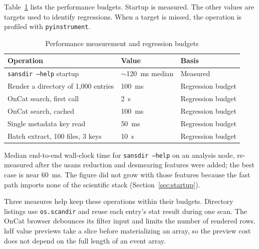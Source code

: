 \documentclass[tm]{ornltm}
\begin{document}
Table~\ref{tab:perf} lists the performance budgets. Startup is measured. The
other values are targets used to identify regressions. When a target is missed,
the operation is profiled with \texttt{pyinstrument}.

\begin{table}[ht]
  \centering
  \begin{threeparttable}
  \caption{Performance measurement and regression budgets}
  \label{tab:perf}
  \small
  \begin{tabular}{p{} l l}
    \toprule
    Operation & Value & Basis \\
    \midrule
    \texttt{sansdir --help} startup & $\sim$120~ms median\tnote{a} & Measured \\
    Render a directory of 1,000 entries & 100~ms & Regression budget \\
    OnCat search, first call & 2~s & Regression budget \\
    OnCat search, cached & 100~ms & Regression budget \\
    Single metadata key read & 50~ms & Regression budget \\
    Batch extract, 100 files, 3 keys & 10~s & Regression budget \\
    \bottomrule
  \end{tabular}
  \begin{tablenotes}
    \item[a] Median end-to-end wall-clock time for \texttt{sansdir --help} on
    an analysis node, re-measured after the \ac{usans} reduction and desmearing
    features were added; the best case is near 60~ms. The figure did not grow
    with those features because the fast path imports none of the scientific
    stack (Section~\ref{sec:startup}).
  \end{tablenotes}
  \end{threeparttable}
\end{table}

Three measures help keep these operations within their budgets. Directory
listings use \texttt{os.scandir} and reuse each entry's stat result during one
scan. The OnCat browser debounces its filter input and limits the number of
rendered rows. \Ac{hdf} value previews take a slice before materializing an
array, so the preview cost does not depend on the full length of an event array.

\end{document}
